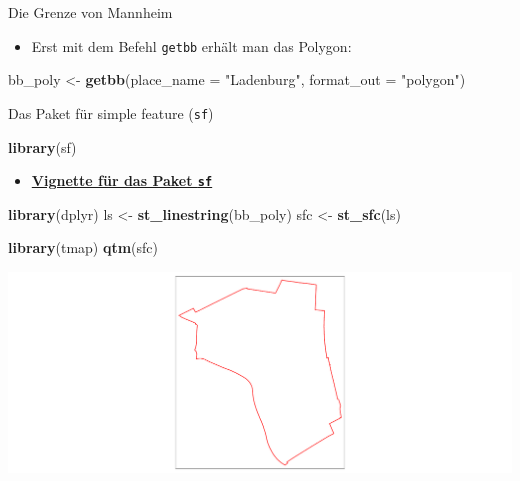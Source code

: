 \documentclass[ignorenonframetext,]{beamer}
\newenvironment{Shaded}{\begin{snugshade}}{\end{snugshade}}
\newcommand{\DataTypeTok}[1]{\textcolor[rgb]{0.13,0.29,0.53}{#1}}
\newcommand{\KeywordTok}[1]{\textcolor[rgb]{0.13,0.29,0.53}{\textbf{#1}}}
\newcommand{\NormalTok}[1]{#1}
\newcommand{\StringTok}[1]{\textcolor[rgb]{0.31,0.60,0.02}{#1}}
\providecommand{\tightlist}{%
  \setlength{\itemsep}{0pt}\setlength{\parskip}{0pt}}
\begin{document}
\begin{frame}[fragile]{Die Grenze von Mannheim}
\protect\hypertarget{die-grenze-von-mannheim}{}

\begin{itemize}
\tightlist
\item
  Erst mit dem Befehl \texttt{getbb} erhält man das Polygon:
\end{itemize}

\begin{Shaded}
\begin{Highlighting}[]
\NormalTok{bb_poly <-}\StringTok{ }\KeywordTok{getbb}\NormalTok{(}\DataTypeTok{place_name =} \StringTok{"Ladenburg"}\NormalTok{, }
                 \DataTypeTok{format_out =} \StringTok{"polygon"}\NormalTok{)}
\end{Highlighting}
\end{Shaded}

\end{frame}

\begin{frame}[fragile]{Das Paket für simple feature (\texttt{sf})}
\protect\hypertarget{das-paket-fur-simple-feature-sf}{}

\begin{Shaded}
\begin{Highlighting}[]
\KeywordTok{library}\NormalTok{(sf)}
\end{Highlighting}
\end{Shaded}

\begin{itemize}
\tightlist
\item
  \href{https://cran.r-project.org/web/packages/sf/vignettes/sf3.html}{\textbf{Vignette
  für das Paket \texttt{sf}}}
\end{itemize}

\begin{Shaded}
\begin{Highlighting}[]
\KeywordTok{library}\NormalTok{(dplyr)}
\NormalTok{ls <-}\StringTok{ }\KeywordTok{st_linestring}\NormalTok{(bb_poly)}
\NormalTok{sfc <-}\StringTok{ }\KeywordTok{st_sfc}\NormalTok{(ls)}
\end{Highlighting}
\end{Shaded}

\begin{Shaded}
\begin{Highlighting}[]
\KeywordTok{library}\NormalTok{(tmap)}
\KeywordTok{qtm}\NormalTok{(sfc)}
\end{Highlighting}
\end{Shaded}

\includegraphics{osmdata_files/figure-beamer/unnamed-chunk-10-1.pdf}

\end{frame}
\end{document}
